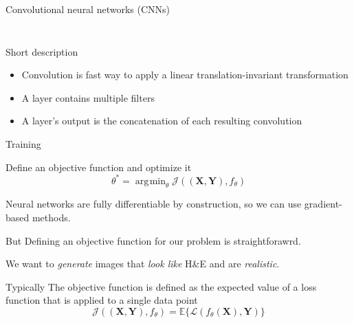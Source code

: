 \documentclass[t]{beamer}
\newcommand{\tensor}[1]{\mathbf{#1}}
\DeclareMathOperator*{\argmin}{arg\!\min}
\begin{document}
\begin{frame}{Convolutional neural networks (CNNs)}
\begin{columns}
\begin{column}{0.6\textwidth}
\begin{figure}
\end{figure}
\end{column}

\end{columns}

\begin{block}{Short description}
\begin{itemize}
\item Convolution is fast way to apply a linear translation-invariant transformation
\item<5-> A layer contains multiple filters
\item<5-> A layer's output is the concatenation of each resulting convolution
\end{itemize}
\end{block}

\end{frame}

\begin{frame}{Training}

\begin{block}{Define an objective function and optimize it}
\[
\theta^* = \argmin_{\theta} \mathcal{J}
\left( (\tensor{X}, \tensor{Y}), f_{\theta} \right)
\]

Neural networks are fully differentiable by construction, so we can use gradient-based methods.
\end{block}\pause

\begin{alertblock}{But}
Defining an objective function for our problem is straightforawrd.

We want to \emph{generate} images that \emph{look like} H\&E and are \emph{realistic}.
\end{alertblock}\pause

\begin{block}{Typically}
The objective function is defined as the expected value of a loss function that is applied to
a single data point
\[
\mathcal{J}\left( (\tensor{X}, \tensor{Y}), f_{\theta} \right) =
\mathbb{E}\{ \mathcal{L} \left( f_{\theta}(\tensor{X}), \tensor{Y} \right) \}
\]
\end{block}
\end{frame}
\end{document}
